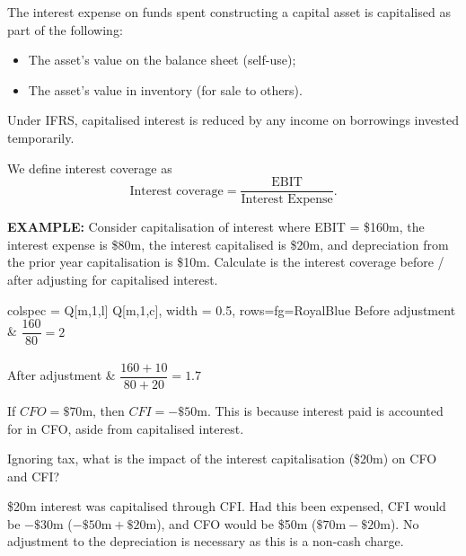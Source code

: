 \documentclass[../notes_compiled.tex]{subfiles}
\begin{document}
\begin{itemize}
\item The interest expense on funds spent constructing a capital asset is capitalised as part of the following:
\begin{itemize}
\item The asset's value on the balance sheet (self-use);
\item The asset's value in inventory (for sale to others).
\end{itemize}
Under IFRS, capitalised interest is reduced by any income on borrowings invested temporarily.

\item We define interest coverage as
\begin{equation}
\text{Interest coverage} = \frac{\mathrm{EBIT}}{\text{Interest Expense}}.
\end{equation}

{\color{RedViolet}
\item[] \textbf{EXAMPLE:} Consider capitalisation of interest where EBIT = \$160m, the interest expense is \$80m, the interest capitalised is \$20m, and depreciation from the prior year capitalisation is \$10m. Calculate is the interest coverage before / after adjusting for capitalised interest.
}
{\color{RoyalBlue}
\begin{table}[H]
\centering
\begin{tblr}{colspec = {Q[m,1,l] Q[m,1,c]}, width = 0.5\textwidth, rows={fg=RoyalBlue}}
Before adjustment & $\dfrac{160}{80}=2$ \\ \\
After adjustment & $\dfrac{160+10}{80+20} = 1.7$
\end{tblr}
\end{table}

If $CFO=\$70$m, then $CFI = -\$50$m. This is because interest paid is accounted for in CFO, aside from capitalised interest.
}

{\color{RedViolet}
Ignoring tax, what is the impact of the interest capitalisation (\$20m) on CFO and CFI?
}

{\color{RoyalBlue}
\$20m interest was capitalised through CFI. Had this been expensed, CFI would be $-\$30$m ($-\$50\mathrm{m} + \$20\mathrm{m}$), and CFO would be \$50m ($\$70\mathrm{m} - \$20\mathrm{m}$). No adjustment to the depreciation is necessary as this is a non-cash charge.
}
\end{itemize}
\end{document}
